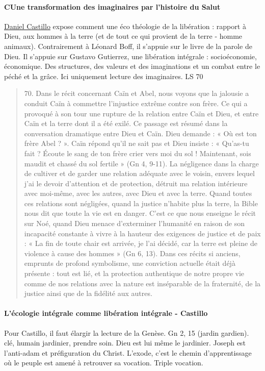 \paragraph{CUne transformation des imaginaires par l'histoire du Salut} 
\href{https://www.loyola.edu/academics/theology/faculty/castillo}{Daniel Castillo} expose comment une éco théologie  de la libération : rapport à Dieu, aux hommes à la terre (et de tout ce qui provient de la terre - homme animaux). Contrairement à Léonard Boff, il s'appuie sur le livre de la parole de Dieu. Il s'appuie sur Gustavo Gutierrez, une libération intégrale : socioéconomie, économique. Des structures, des valeurs et des imaginations et un combat entre le péché et la grâce.
Ici uniquement lecture des imaginaires.
LS 70
\begin{quote}
    70. Dans le récit concernant Caïn et Abel, nous voyons que la jalousie a conduit Caïn à commettre l’injustice extrême contre son frère. Ce qui a provoqué à son tour une rupture de la relation entre Caïn et Dieu, et entre Caïn et la terre dont il a été exilé. Ce passage est résumé dans la conversation dramatique entre Dieu et Caïn. Dieu demande : « Où est ton frère Abel ? ». Caïn répond qu’il ne sait pas et Dieu insiste : « Qu’as-tu fait ? Écoute le sang de ton frère crier vers moi du sol ! Maintenant, sois maudit et chassé du sol fertile » (Gn 4, 9-11). La négligence dans la charge de cultiver et de garder une relation adéquate avec le voisin, envers lequel j’ai le devoir d’attention et de protection, détruit ma relation intérieure avec moi-même, avec les autres, avec Dieu et avec la terre. Quand toutes ces relations sont négligées, quand la justice n’habite plus la terre, la Bible nous dit que toute la vie est en danger. C’est ce que nous enseigne le récit sur Noé, quand Dieu menace d’exterminer l’humanité en raison de son incapacité constante à vivre à la hauteur des exigences de justice et de paix : « La fin de toute chair est arrivée, je l’ai décidé, car la terre est pleine de violence à cause des hommes » (Gn 6, 13). Dans ces récits si anciens, emprunts de profond symbolisme, une conviction actuelle était déjà présente : tout est lié, et la protection authentique de notre propre vie comme de nos relations avec la nature est inséparable de la fraternité, de la justice ainsi que de la fidélité aux autres.
\end{quote}

\paragraph{L'écologie intégrale comme libération intégrale - Castillo}
Pour Castillo, il faut élargir la lecture de la Genèse. Gn 2, 15 (jardin gardien). clé, humain jardinier, prendre soin.  Dieu est lui même le jardinier. Joseph est l'anti-adam et préfiguration du Christ.  L'exode, c'est le chemin d'apprentissage où le peuple est amené à retrouver sa vocation. Triple vocation.  

